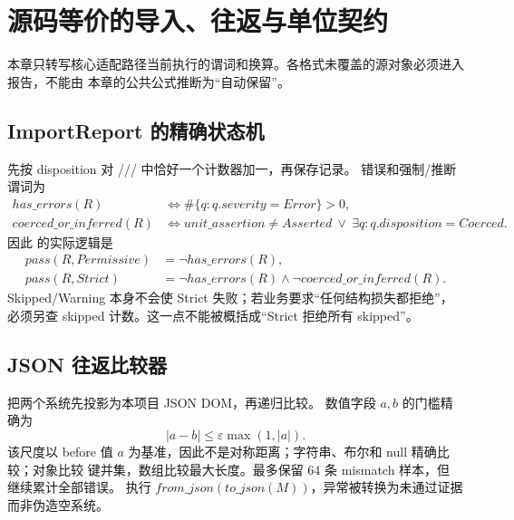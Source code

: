 \section{源码等价的导入、往返与单位契约}\label{sec:io-source-equivalent}

本章只转写核心适配路径当前执行的谓词和换算。各格式未覆盖的源对象必须进入报告，不能由
本章的公共公式推断为“自动保留”。

\subsection{ImportReport 的精确状态机}
 先按 disposition 对
/// 中恰好一个计数器加一，再保存记录。
错误和强制/推断谓词为
\begin{align}
 has\_errors(R)&\Longleftrightarrow \#\{q:q.severity=Error\}>0,\\
 coerced\_or\_inferred(R)&\Longleftrightarrow
 unit\_assertion\ne Asserted\ \lor\ \exists q:q.disposition=Coerced.
\end{align}
因此  的实际逻辑是
\begin{align}
 pass(R,Permissive)&=\neg has\_errors(R),\\
 pass(R,Strict)&=\neg has\_errors(R)\land\neg coerced\_or\_inferred(R).
\end{align}
Skipped/Warning 本身不会使 Strict 失败；若业务要求“任何结构损失都拒绝”，必须另查 skipped
计数。这一点不能被概括成“Strict 拒绝所有 skipped”。

\subsection{JSON 往返比较器}
 把两个系统先投影为本项目 JSON DOM，再递归比较。
数值字段 $a,b$ 的门槛精确为
\begin{equation}
 |a-b|\le\varepsilon\max(1,|a|).
\end{equation}
该尺度以 before 值 $a$ 为基准，因此不是对称距离；字符串、布尔和 null 精确比较；对象比较
键并集，数组比较最大长度。最多保留 64 条 mismatch 样本，但
 继续累计全部错误。
执行 $from\_json(to\_json(M))$，异常被转换为未通过证据而非伪造空系统。

